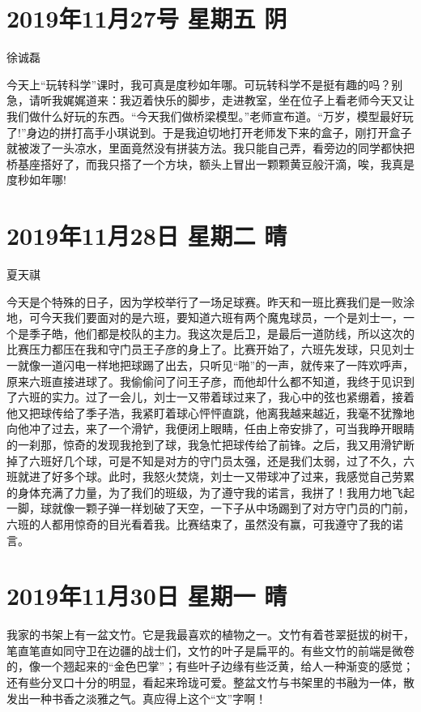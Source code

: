 \section{2019年11月27号 星期五 阴}

徐诚磊

今天上``玩转科学''课时，我可真是度秒如年哪。可玩转科学不是挺有趣的吗？别急，请听我娓娓道来：我迈着快乐的脚步，走进教室，坐在位子上看老师今天又让我们做什么好玩的东西。``今天我们做桥梁模型。''老师宣布道。``万岁，模型最好玩了!''身边的拼打高手小琪说到。于是我迫切地打开老师发下来的盒子，刚打开盒子就被泼了一头凉水，里面竟然没有拼装方法。我只能自己弄，看旁边的同学都快把桥基座搭好了，而我只搭了一个方块，额头上冒出一颗颗黄豆般汗滴，唉，我真是度秒如年哪!

\section{2019年11月28日 星期二 晴}

夏天祺

今天是个特殊的日子，因为学校举行了一场足球赛。昨天和一班比赛我们是一败涂地，可今天我们要面对的是六班，要知道六班有两个魔鬼球员，一个是刘士一，一个是季子皓，他们都是校队的主力。我这次是后卫，是最后一道防线，所以这次的比赛压力都压在我和守门员王子彦的身上了。比赛开始了，六班先发球，只见刘士一就像一道闪电一样地把球踢了出去，只听见``啪''的一声，就传来了一阵欢呼声，原来六班直接进球了。我偷偷问了问王子彦，而他却什么都不知道，我终于见识到了六班的实力。过了一会儿，刘士一又带着球过来了，我心中的弦也紧绷着，接着他又把球传给了季子浩，我紧盯着球心怦怦直跳，他离我越来越近，我毫不犹豫地向他冲了过去，来了一个滑铲，我便闭上眼睛，任由上帝安排了，可当我睁开眼睛的一刹那，惊奇的发现我抢到了球，我急忙把球传给了前锋。之后，我又用滑铲断掉了六班好几个球，可是不知是对方的守门员太强，还是我们太弱，过了不久，六班就进了好多个球。此时，我怒火焚烧，刘士一又带球冲了过来，我感觉自己劳累的身体充满了力量，为了我们的班级，为了遵守我的诺言，我拼了！我用力地飞起一脚，球就像一颗子弹一样划破了天空，一下子从中场踢到了对方守门员的门前，六班的人都用惊奇的目光看着我。比赛结束了，虽然没有赢，可我遵守了我的诺言。

\section{2019年11月30日 星期一 晴}

我家的书架上有一盆文竹。它是我最喜欢的植物之一。文竹有着苍翠挺拔的树干，笔直笔直如同守卫在边疆的战士们，文竹的叶子是扁平的。有些文竹的前端是微卷的，像一个翘起来的``金色巴掌''；有些叶子边缘有些泛黄，给人一种渐变的感觉；还有些分叉口十分的明显，看起来玲珑可爱。整盆文竹与书架里的书融为一体，散发出一种书香之淡雅之气。真应得上这个``文''字啊！


